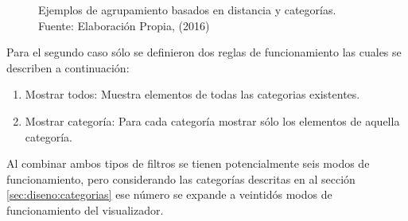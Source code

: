 \begin{figure}[H]
\centering
\captionsetup{justification=centering}
\hfill
{}
\caption[Ejemplos de agrupamiento basados en distancia y categorías.]{Ejemplos de agrupamiento basados en distancia y categorías.\\Fuente: Elaboración Propia, (2016)}
\label{fig:EjemploAmbosClusters}
\end{figure}

Para el segundo caso sólo se definieron dos reglas de funcionamiento las cuales se describen a continuación:

\begin{enumerate}
\item Mostrar todos: Muestra elementos de todas las categorias existentes.
\item Mostrar categoría: Para cada categoría mostrar sólo los elementos de aquella categoría. 
\end{enumerate}

Al combinar ambos tipos de filtros se tienen potencialmente seis modos de funcionamiento, pero considerando las categorías descritas en al sección \ref{sec:diseno:categorias} ese número se expande a veintidós modos de funcionamiento del visualizador.

